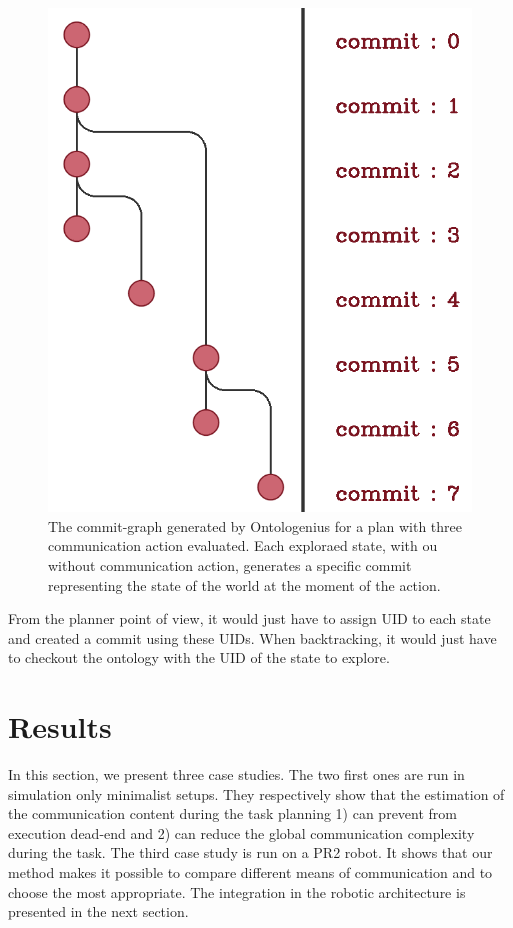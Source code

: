 \begin{figure}[!ht]
\centering
\includegraphics[scale=0.25]{figures/chapter5/versioning_advance.png}
\caption{\label{fig:chap5_versioning_advance} The commit-graph generated by Ontologenius for a plan with three communication action evaluated. Each exploraed state, with ou without communication action, generates a specific commit representing the state of the world at the moment of the action. }
\end{figure}

From the planner point of view, it would just have to assign UID to each state and created a commit using these UIDs. When backtracking, it would just have to checkout the ontology with the UID of the state to explore.


\section{Results}

In this section, we present three case studies. The two first ones are run in simulation only minimalist setups. They respectively show that the estimation of the communication content during the task planning 1) can prevent from execution dead-end and 2) can reduce the global communication complexity during the task. The third case study is run on a PR2 robot. It shows that our method makes it possible to compare different means of communication and to choose the most appropriate. The integration in the robotic architecture is presented in the next section.

